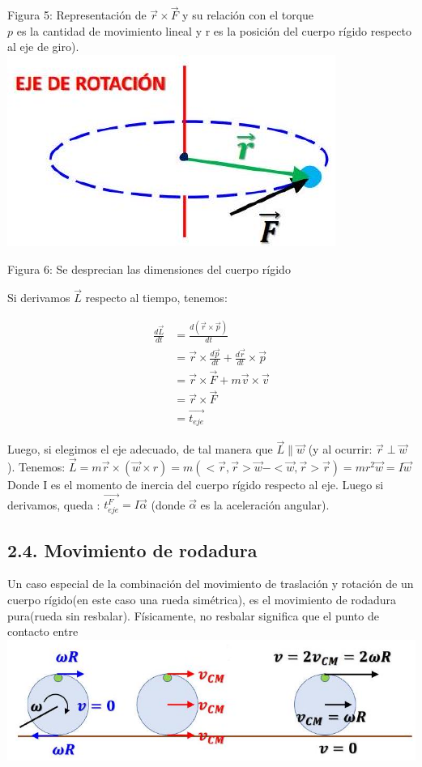 \documentclass[10pt]{article}
\begin{document}
Figura 5: Representación de $\vec{r} \times \vec{F}$ y su relación con el torque\\
$p$ es la cantidad de movimiento lineal y r es la posición del cuerpo rígido respecto al eje de giro).\\
\includegraphics[scale = 0.15, center]{2025_04_01_ea720b93e8ebb5d0c6aeg-07}

Figura 6: Se desprecian las dimensiones del cuerpo rígido

Si derivamos $\vec{L}$ respecto al tiempo, tenemos:

$$
\begin{aligned}
\frac{d \vec{L}}{d t} & =\frac{d(\vec{r} \times \vec{p})}{d t} \\
& =\vec{r} \times \frac{d \vec{p}}{d t}+\frac{d \vec{r}}{d t} \times \vec{p} \\
& =\vec{r} \times \vec{F}+m \vec{v} \times \vec{v} \\
& =\vec{r} \times \vec{F} \\
& =\overrightarrow{t_{e j e}}
\end{aligned}
$$

Luego, si elegimos el eje adecuado, de tal manera que $\vec{L} \| \vec{w}$ (y al ocurrir: $\vec{r} \perp \vec{w}$ ). Tenemos: $\vec{L}=m \vec{r} \times(\vec{w} \times r)=m(<\vec{r}, \vec{r}>\vec{w}-<\vec{w}, \vec{r}>\vec{r})=m r^{2} \vec{w}=I \vec{w}$ Donde I es el momento de inercia del cuerpo rígido respecto al eje. Luego si derivamos, queda : $\overrightarrow{t_{e j e}^{F}}=I \vec{\alpha}$ (donde $\vec{\alpha}$ es la aceleración angular).

\subsection*{2.4. Movimiento de rodadura}
Un caso especial de la combinación del movimiento de traslación y rotación de un cuerpo rígido(en este caso una rueda simétrica), es el movimiento de rodadura pura(rueda sin resbalar). Físicamente, no resbalar significa que el punto de contacto entre\\
\includegraphics[scale = 0.15, center]{2025_04_01_ea720b93e8ebb5d0c6aeg-08(1)}
\end{document}
